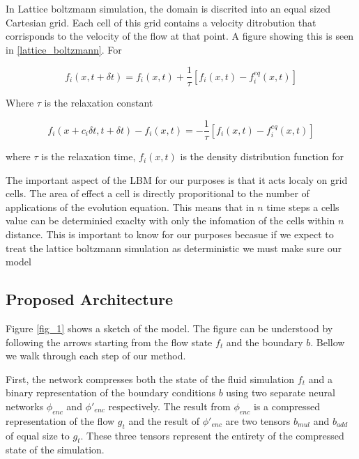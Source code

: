 \documentclass{article}
\begin{document}
In Lattice boltzmann simulation, the domain is discrited into an equal sized Cartesian grid. Each cell of this grid contains a velocity ditrobution that corrisponds to the velocity of the flow at that point. A figure showing this is seen in \ref{lattice_boltzmann}. For 

\begin{equation}
  f_i(x, t+ \delta{t}) = f_i(x,t) + \frac{1}{\tau} [f_i(x,t) - f_i^{eq}(x,t)]
\end{equation}

Where $\tau$ is the relaxation constant

\begin{equation}
  f_i(x+c_i \delta{t}, t+ \delta{t}) - f_i(x,t) = -\frac{1}{\tau} [f_i(x,t) - f_i^{eq}(x,t)]
\end{equation}

where $\tau$ is the relaxation time, $f_i(x,t)$ is the density distribution function for


The important aspect of the LBM for our purposes is that it acts localy on grid cells. The area of effect a cell is directly proporitional to the number of applications of the evolution equation. This means that in $n$ time steps a cells value can be determinied exaclty with only the infomation of the cells within $n$ distance. This is important to know for our purposes becasue if we expect to treat the lattice boltzmann simulation as deterministic we must make sure our model 

\subsection{Proposed Architecture}

Figure \ref{fig_1} shows a sketch of the model. The figure can be understood by following the arrows starting from the flow state $f_t$ and the boundary $b$. Bellow we walk through each step of our method.

First, the network compresses both the state of the fluid simulation $f_t$ and a binary representation of the boundary conditions $b$ using two separate neural networks $\phi_{enc}$ and $\phi'_{enc}$ respectively. The result from $\phi_{enc}$ is a compressed representation of the flow $g_t$ and the result of $\phi'_{enc}$ are two tensors $b_{mul}$ and $b_{add}$ of equal size to $g_t$. These three tensors represent the entirety of the compressed state of the simulation.
\end{document}
